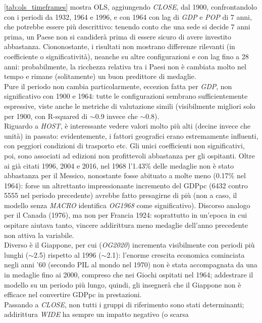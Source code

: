 \cref{tab:ols_timeframes} mostra OLS, aggiungendo \textit{CLOSE}, dal 1900,
confrontandolo con i periodi da 1932, 1964 e 1996, e con 1964 con lag di
\textit{GDP} e \textit{POP} di 7 anni, che potrebbe essere più descrittivo:
tenendo conto che una sede si decide 7 anni prima, un Paese non si candiderà
prima di essere sicuro di avere investito abbastanza. Ciononostante, i risultati
non mostrano differenze rilevanti (in coefficiente o significatività), neanche
su altre configurazioni e con lag fino a 28 anni: probabilmente, la ricchezza
relativa tra i Paesi non è cambiata molto nel tempo e rimane (solitamente) un
buon predittore di medaglie.\\
Pure il periodo non cambia particolarmente, eccezion fatta per \textit{GDP}, non
significativo con 1900 e 1964: tutte le configurazioni sembrano sufficientemente
espressive, viste anche le metriche di valutazione simili (visibilmente migliori
solo per 1900, con R-squared di $\sim$0.9 invece che $\sim$0.8).\\
Riguardo a \textit{HOST}, è interessante vedere valori molto più alti (decine
invece che unità) in passato: evidentemente, i fattori geografici erano
estremamente influenti, con peggiori condizioni di trasporto etc. Gli unici
coefficienti non significativi, poi, sono associati ad edizioni non profittevoli
abbastanza per gli ospitanti. Oltre ai già citati 1996, 2004 e 2016, nel 1968
l'1.43\% delle medaglie non è stato abbastanza per il Messico, nonostante fosse
abituato a molte meno (0.17\% nel 1964): forse un altrettanto impressionante
incremento del GDPpc (6432 contro 5555 nel periodo precedente) avrebbe fatto
presagirne di più (non a caso, il modello senza \textit{MACRO} identifica
\textit{OG1968} come significativo). Discorso analogo per il Canada (1976), ma
non per Francia 1924: soprattutto in un'epoca in cui ospitare aiutava tanto,
vincere addirittura meno medaglie dell'anno precedente non attiva la
variabile.\\
Diverso è il Giappone, per cui (\textit{OG2020}) incrementa visibilmente con
periodi più lunghi ($\sim$2.5) rispetto al 1996 ($\sim$2.1): l'enorme crescita
economica cominciata negli anni '60 (secondo PIL al mondo nel 1970) non è stata
accompagnata da una in medaglie fino ai 2000, compreso che nei Giochi ospitati
nel 1964; addestrare il modello su un periodo più lungo, quindi, gli insegnerà
che il Giappone non è efficace nel convertire GDPpc in prestazioni.\\
Passando a \textit{CLOSE}, non tutti i gruppi di riferimento sono stati
determinanti; addirittura \textit{WIDE} ha sempre un impatto negativo (o scarsa
